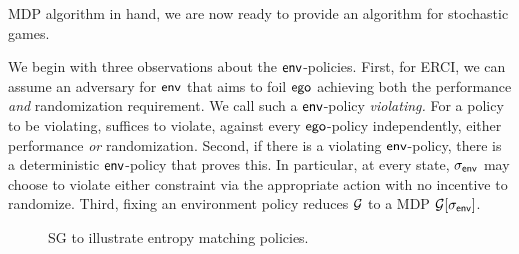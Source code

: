 
MDP algorithm in hand, we are now ready to provide an algorithm for
stochastic games.


 We begin with three observations about
the $\mathsf{env}$-policies.  First, for ERCI, we can assume an adversary for $\mathsf{env}$ 
that aims to foil $\mathsf{ego}$ achieving both the performance \emph{and}
randomization requirement. We call such a $\mathsf{env}$-policy \emph{violating.} For a policy to be violating,  suffices to violate, against every $\mathsf{ego}$-policy independently, either
performance \emph{or} randomization.  Second, if there is a violating
$\mathsf{env}$-policy, there is a deterministic $\mathsf{env}$-policy that proves
this.  In particular, at every state, ${\sigma_{\mathsf{env}}}$ may choose to
violate either constraint via the appropriate action with no incentive
to randomize. Third, fixing an environment policy reduces $\mathcal{G}$ to a
MDP $\mathcal{G}[{\sigma_{\mathsf{env}}}]$.

\begin{figure}[t]
\centering
\scalebox{0.8}{

}
\caption{SG to illustrate entropy matching policies.}
\label{fig:sg:simplest}
\end{figure}

